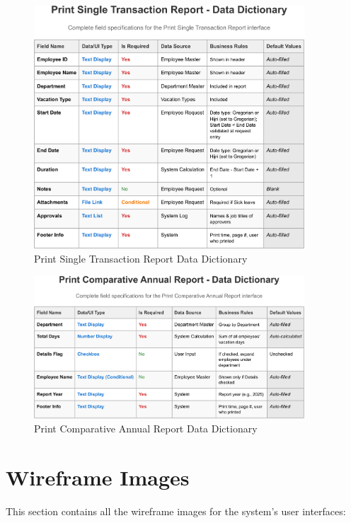 \documentclass[12pt,a4paper]{article}
\begin{document}
\begin{figure}[H]
\centering
\includegraphics[width=0.9\textwidth]{Data-Dictionary/Screen-Data-Dictionaries/Print-Single-Transaction-Report-Data-Dictionary/Print-Single-Transaction-Report-Data-Dictionary-1.png}
\caption{Print Single Transaction Report Data Dictionary}
\label{fig:print-single-transaction-data-dict}
\end{figure}

\begin{figure}[H]
\centering
\includegraphics[width=0.9\textwidth]{Data-Dictionary/Screen-Data-Dictionaries/Print-Comparative-Annual-Report-Data-Dictionary/Print-Comparative-Annual-Report-Data-Dictionary-1.png}
\caption{Print Comparative Annual Report Data Dictionary}
\label{fig:print-comparative-annual-data-dict}
\end{figure}

\section{Wireframe Images}
This section contains all the wireframe images for the system's user interfaces:
\end{document}
